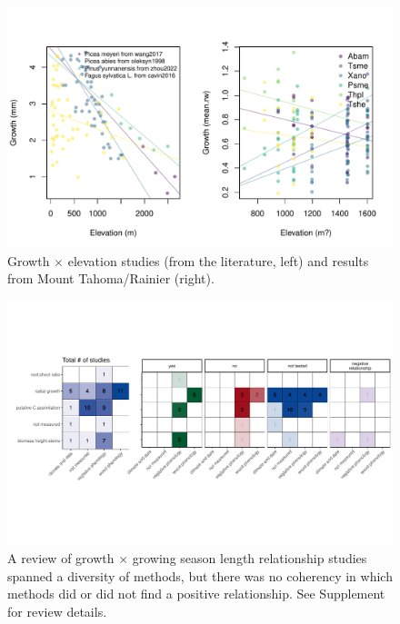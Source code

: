 \documentclass[11pt]{article}
\begin{document}
\begin{figure}[h!]
\includegraphics[width=1\textwidth]{..//analyses/growthxelevationetc/figures/growthxelev2part.pdf}
\caption{Growth $\times$ elevation studies (from the literature, left) and results from Mount Tahoma/Rainier (right).}
\label{fig:gxelev}
\end{figure}

\clearpage
\begin{figure}[h!]
\includegraphics[width=1\textwidth]{..//figures/heatmaps/combinedheatmap_gslxgrowth_simple.pdf}
\caption{A review of growth $\times$ growing season length relationship studies spanned a diversity of methods, but there was no coherency in which methods did or did not find a positive relationship. See Supplement for review details.}
\label{fig:heatmaps}
\end{figure}
\end{document}
